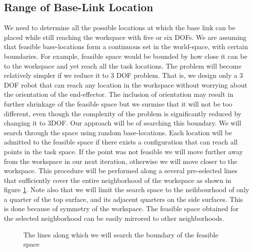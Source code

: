 \documentclass[a4paper,10pt]{article}
\begin{document}
\subsection{Range of Base-Link Location}
We need to determine all the possible locations at which the base link can be placed while still reaching
the workspace with five or six DOFs. We are assuming that feasible base-locations form a continuous set in the world-space, with certain boundaries. For example, feasible space would
be bounded by how close it can be to the workspace and yet reach all the task locations. The problem will become relatively simpler if we reduce it to 3 DOF problem. That is, we design only a 3 DOF robot
that can reach any location in the workspace without worrying about the orientation of the end-effector. The inclusion of orientation may result in
further shrinkage of the feasible space but we surmise that it will not be too different, even though the complexity of the problem is significantly reduced by changing it to 3DOF.
Our approach will be of searching this boundary. We will search through the space using random base-locations. Each location will be admitted to the feasible space if there exists a configuration that can reach all points in the task space. If the point was not feasible we will move further away from the workspace in our next iteration, otherwise we will move closer to the workspace. This procedure will be performed along a several pre-selected lines that sufficiently cover the entire neighborhood of the workspace as shown in figure \ref{fig:baseLinkSearchLines}. Note also that we will limit the search space to the neihbourhood of only a quarter of the top surface, and its adjacent quarters on the side surfaces. This is done because of symmetry of the workspace. The feasible space obtained for the selected neighborhood can be easily mirrored to other neighborhoods.

\begin{figure}[h]
\centering {}
\caption{The lines along which we will search the boundary of the feasible space}
\label{fig:baseLinkSearchLines} 
\end{figure}
\end{document}
